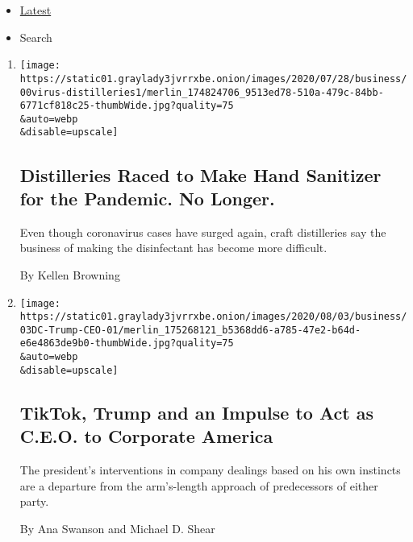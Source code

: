 \begin{itemize}
\tightlist
\item
  \protect\hyperlink{stream-panel}{Latest}
\item
  Search
\end{itemize}

\begin{enumerate}
\def\labelenumi{\arabic{enumi}.}
\item
  \href{/2020/08/04/business/distilleries-hand-sanitizer-pandemic.html}{}

  \texttt{[image: https://static01.graylady3jvrrxbe.onion/images/2020/07/28/business/00virus-distilleries1/merlin\_174824706\_9513ed78-510a-479c-84bb-6771cf818c25-thumbWide.jpg?quality=75\\\&auto=webp\\\&disable=upscale]}

  \hypertarget{distilleries-raced-to-make-hand-sanitizer-for-the-pandemic-no-longer}{%
  \subsection{Distilleries Raced to Make Hand Sanitizer for the
  Pandemic. No
  Longer.}\label{distilleries-raced-to-make-hand-sanitizer-for-the-pandemic-no-longer}}

  Even though coronavirus cases have surged again, craft distilleries
  say the business of making the disinfectant has become more difficult.

  By Kellen Browning
\item
  \href{/2020/08/03/business/economy/trump-tiktok-china-business.html}{}

  \texttt{[image: https://static01.graylady3jvrrxbe.onion/images/2020/08/03/business/03DC-Trump-CEO-01/merlin\_175268121\_b5368dd6-a785-47e2-b64d-e6e4863de9b0-thumbWide.jpg?quality=75\\\&auto=webp\\\&disable=upscale]}

  \hypertarget{tiktok-trump-and-an-impulse-to-act-as-ceo-to-corporate-america}{%
  \subsection{TikTok, Trump and an Impulse to Act as C.E.O. to Corporate
  America}\label{tiktok-trump-and-an-impulse-to-act-as-ceo-to-corporate-america}}

  The president's interventions in company dealings based on his own
  instincts are a departure from the arm's-length approach of
  predecessors of either party.

  By Ana Swanson and Michael D. Shear


\end{enumerate}
